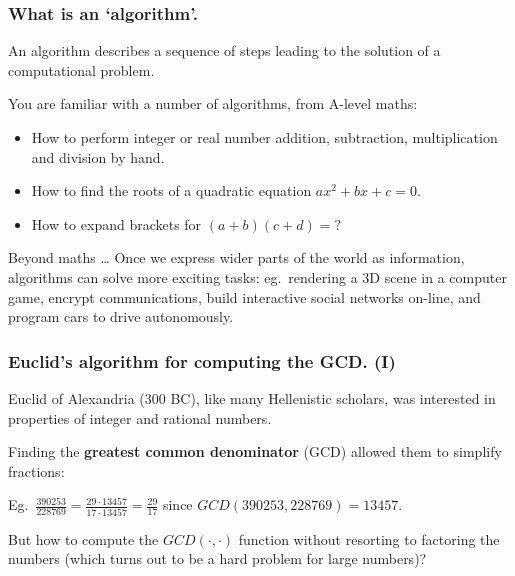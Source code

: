 \documentclass{beamer} %
\newcommand\emc[1]{\textcolor{brightblue}{\textbf{#1}}}
\begin{document}
\begin{frame}
\frametitle{What is an `algorithm'.} 

An algorithm describes a sequence of steps leading to the solution of a computational problem.

\vspace{5mm}
You are familiar with a number of algorithms, from A-level maths:
\begin{itemize}
\item How to perform integer or real number addition, subtraction, multiplication and division by hand.
\item How to find the roots of a quadratic equation $ax^2+bx+c = 0$.
\item How to expand brackets for $(a+b)(c+d) = ?$
\end{itemize}

\begin{block}{Beyond maths \ldots}
Once we express wider parts of the world as information, algorithms can solve more exciting tasks: eg.\ rendering a 3D scene in a computer game, encrypt communications, build interactive social networks on-line, and program cars to drive autonomously.
\end{block}

\end{frame}

\begin{frame}
\frametitle{Euclid's algorithm for computing the GCD. (I)} 

Euclid of Alexandria (300 BC), like many Hellenistic scholars, was interested in properties of integer and rational numbers. 

\vspace{5mm}
Finding the \emc{greatest common denominator} (GCD) allowed them to simplify fractions:

\vspace{5mm}
Eg.\ $\frac{390253}{228769} = \frac{29 \cdot 13457}{17 \cdot 13457} = \frac{29}{17}$ since $GCD(390253, 228769) = 13457$.

\vspace{5mm}
But how to compute the $GCD(\cdot, \cdot)$ function without resorting to factoring the numbers (which turns out to be a hard problem for large numbers)?

\end{frame}
\end{document}
